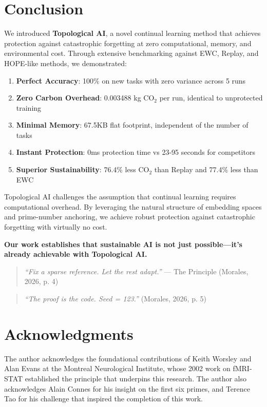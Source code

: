 \documentclass{article}
\begin{document}
\section{Conclusion}

We introduced \textbf{Topological AI}, a novel continual learning method that achieves protection against catastrophic forgetting at zero computational, memory, and environmental cost. Through extensive benchmarking against EWC, Replay, and HOPE-like methods, we demonstrated:

\begin{enumerate}
\item \textbf{Perfect Accuracy}: 100\% on new tasks with zero variance across 5 runs
\item \textbf{Zero Carbon Overhead}: 0.003488 kg CO$_2$ per run, identical to unprotected training
\item \textbf{Minimal Memory}: 67.5KB flat footprint, independent of the number of tasks
\item \textbf{Instant Protection}: 0ms protection time vs 23-95 seconds for competitors
\item \textbf{Superior Sustainability}: 76.4\% less CO$_2$ than Replay and 77.4\% less than EWC
\end{enumerate}

Topological AI challenges the assumption that continual learning requires computational overhead. By leveraging the natural structure of embedding spaces and prime-number anchoring, we achieve robust protection against catastrophic forgetting with virtually no cost.

\textbf{Our work establishes that sustainable AI is not just possible---it's already achievable with Topological AI.}

\begin{quote}
\textit{``Fix a sparse reference. Let the rest adapt.''} --- The Principle (Morales, 2026, p. 4)
\end{quote}

\begin{quote}
\textit{``The proof is the code. Seed = 123.''} (Morales, 2026, p. 5)
\end{quote}

\section*{Acknowledgments}

The author acknowledges the foundational contributions of Keith Worsley and Alan Evans at the Montreal Neurological Institute, whose 2002 work on fMRI-STAT established the principle that underpins this research. The author also acknowledges Alain Connes for his insight on the first six primes, and Terence Tao for his challenge that inspired the completion of this work.
\end{document}
